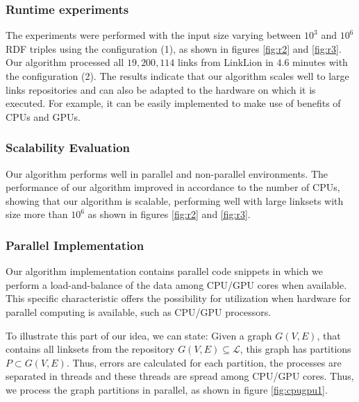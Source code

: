 \subsubsection{Runtime experiments}

The experiments were performed with the input size varying between $10^3$ and $10^6$ RDF triples using the configuration (1), as shown in figures \ref{fig:r2} and \ref{fig:r3}. Our algorithm processed all $19,200,114$ links from LinkLion in $4.6$ minutes with the configuration (2). 
The results indicate that our algorithm scales well to large links repositories and can also be adapted to the hardware on which it is executed. For example, it can be easily implemented to make use of benefits of CPUs and GPUs.

\subsubsection{Scalability Evaluation}

Our algorithm performs well in parallel and non-parallel environments. The performance of our algorithm improved in accordance to the number of CPUs, showing that our algorithm is scalable, performing well with large linksets with size more than $10^6$ as shown in figures \ref{fig:r2} and \ref{fig:r3}.

\subsubsection{Parallel Implementation}

Our algorithm implementation contains parallel code snippets in which we perform a load-and-balance of the data among CPU/GPU cores when available. This specific characteristic offers the possibility for utilization when hardware for parallel computing is available, such as CPU/GPU processors.


To illustrate this part of our idea, we can state: Given a graph $G(V,E)$, that contains all linksets from the repository $G(V,E) \subseteq \mathcal{L}$, this graph has partitions $P \subset G(V,E)$. Thus, errors are calculated for each partition, the processes are separated in threads and these threads are spread among CPU/GPU cores. Thus, we process the graph partitions in parallel, as shown in figure \ref{fig:cpugpu1}.

